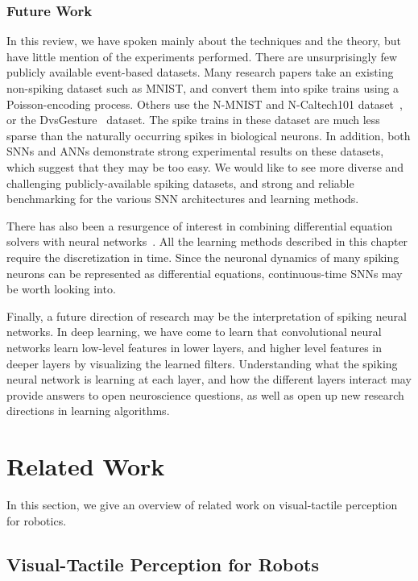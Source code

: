 \documentclass[fyp]{socreport}
\begin{document}
\subsection{Future Work}

In this review, we have spoken mainly about the techniques and the theory, but
have little mention of the experiments performed. There are unsurprisingly few
publicly available event-based datasets. Many research papers take an existing
non-spiking dataset such as MNIST, and convert them into spike trains using a
Poisson-encoding process. Others use the N-MNIST and N-Caltech101
dataset~\cite{orchard15_conver_static_image_datas_to}, or the
DvsGesture~\cite{dvsgesture} dataset. The spike trains in these dataset are much
less sparse than the naturally occurring spikes in biological neurons. In
addition, both SNNs and ANNs demonstrate strong experimental results on these
datasets, which suggest that they may be too easy. We would like to see more
diverse and challenging publicly-available spiking datasets, and strong and
reliable benchmarking for the various SNN architectures and learning methods.

There has also been a resurgence of interest in combining differential equation
solvers with neural networks~\cite{NIPS2018_7892}. All the learning methods
described in this chapter require the discretization in time. Since the neuronal
dynamics of many spiking neurons can be represented as differential equations,
continuous-time SNNs may be worth looking into.

Finally, a future direction of research may be the interpretation of spiking
neural networks. In deep learning, we have come to learn that convolutional
neural networks learn low-level features in lower layers, and higher level
features in deeper layers by visualizing the learned filters. Understanding what
the spiking neural network is learning at each layer, and how the different
layers interact may provide answers to open neuroscience questions, as well as
open up new research directions in learning algorithms.

\chapter{Related Work\label{cha:related}}

In this section, we give an overview of related work on visual-tactile
perception for robotics.

\section{Visual-Tactile Perception for Robots}
\end{document}
